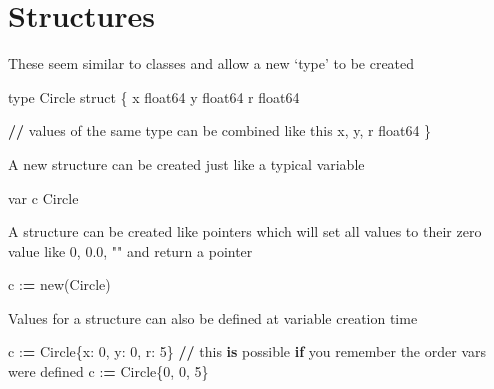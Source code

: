 \documentclass[]{book}
\newenvironment{Shaded}{\begin{snugshade}}{\end{snugshade}}
\newcommand{\BuiltInTok}[1]{#1}
\newcommand{\ControlFlowTok}[1]{\textcolor[rgb]{0.13,0.29,0.53}{\textbf{#1}}}
\newcommand{\DecValTok}[1]{\textcolor[rgb]{0.00,0.00,0.81}{#1}}
\newcommand{\KeywordTok}[1]{\textcolor[rgb]{0.13,0.29,0.53}{\textbf{#1}}}
\newcommand{\NormalTok}[1]{#1}
\newcommand{\OperatorTok}[1]{\textcolor[rgb]{0.81,0.36,0.00}{\textbf{#1}}}
\begin{document}
\hypertarget{structures}{%
\section{Structures}\label{structures}}

These seem similar to classes and allow a new `type' to be created

\begin{Shaded}
\begin{Highlighting}[]
\BuiltInTok{type}\NormalTok{ Circle struct \{}
\NormalTok{x float64}
\NormalTok{y float64}
\NormalTok{r float64}

    \OperatorTok{//}\NormalTok{ values of the same }\BuiltInTok{type}\NormalTok{ can be combined like this}
\NormalTok{    x, y, r float64 }
\NormalTok{\}                   }
\end{Highlighting}
\end{Shaded}

A new structure can be created just like a typical variable

\begin{Shaded}
\begin{Highlighting}[]
\NormalTok{var c Circle}
\end{Highlighting}
\end{Shaded}

A structure can be created like pointers which will set all values to their zero value like 0, 0.0, "" and return a pointer

\begin{Shaded}
\begin{Highlighting}[]
\NormalTok{c :}\OperatorTok{=}\NormalTok{ new(Circle)}
\end{Highlighting}
\end{Shaded}

Values for a structure can also be defined at variable creation time

\begin{Shaded}
\begin{Highlighting}[]
\NormalTok{c :}\OperatorTok{=}\NormalTok{ Circle\{x: }\DecValTok{0}\NormalTok{, y: }\DecValTok{0}\NormalTok{, r: }\DecValTok{5}\NormalTok{\}}
\OperatorTok{//}\NormalTok{ this }\KeywordTok{is}\NormalTok{ possible }\ControlFlowTok{if}\NormalTok{ you remember the order }\BuiltInTok{vars}\NormalTok{ were defined}
\NormalTok{c :}\OperatorTok{=}\NormalTok{ Circle\{}\DecValTok{0}\NormalTok{, }\DecValTok{0}\NormalTok{, }\DecValTok{5}\NormalTok{\}}
\end{Highlighting}
\end{Shaded}
\end{document}
